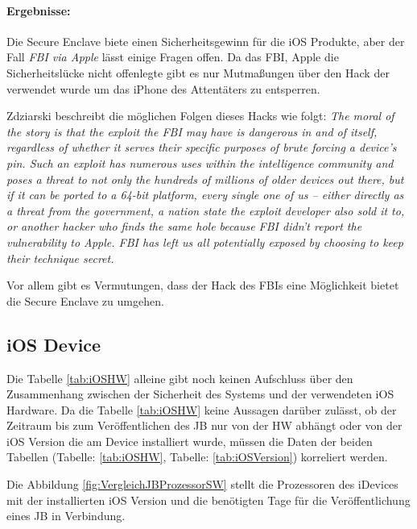 \paragraph{Ergebnisse:} Die Secure Enclave biete einen Sicherheitsgewinn für die iOS Produkte, aber der Fall \textit{\glqq FBI via Apple\grqq{}} lässt einige Fragen offen. Da das FBI, Apple die Sicherheitslücke nicht offenlegte gibt es nur Mutmaßungen über den Hack der verwendet wurde um das iPhone des Attentäters zu entsperren. \par 

Zdziarski beschreibt die möglichen Folgen dieses Hacks wie folgt: \textit{\glqq The moral of the story is that the exploit the FBI may have is dangerous in and of itself, regardless of whether it serves their specific purposes of brute forcing a device’s pin. Such an exploit has numerous uses within the intelligence community and poses a threat to not only the hundreds of millions of older devices out there, but if it can be ported to a 64-bit platform, every single one of us – either directly as a threat from the government, a nation state the exploit developer also sold it to, or another hacker who finds the same hole because FBI didn’t report the vulnerability to Apple. FBI has left us all potentially exposed by choosing to keep their technique secret.\grqq{}} \cite{Hacking[4]} \par 

Vor allem gibt es Vermutungen, dass der Hack des FBIs eine Möglichkeit bietet die Secure Enclave zu umgehen.

\subsection{iOS Device}
\label{sec:Frage1iOSDevice} 

Die Tabelle \ref{tab:iOSHW} alleine gibt noch keinen Aufschluss über den Zusammenhang zwischen der Sicherheit des Systems und der verwendeten iOS Hardware. Da die Tabelle \ref{tab:iOSHW} keine Aussagen darüber zulässt, ob der Zeitraum bis zum Veröffentlichen des JB nur von der HW abhängt oder von der iOS Version die am Device installiert wurde, müssen die Daten der beiden Tabellen (Tabelle: \ref{tab:iOSHW}, Tabelle: \ref{tab:iOSVersion}) korreliert werden. \par 
Die Abbildung \ref{fig:VergleichJBProzessorSW} stellt die Prozessoren des iDevices mit der installierten iOS Version und die benötigten Tage für die Veröffentlichung eines JB in Verbindung. \par


